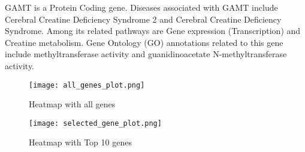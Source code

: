 \documentclass{article}
\begin{document}
GAMT is a Protein Coding gene.
Diseases associated with GAMT include Cerebral Creatine Deficiency Syndrome 2 and Cerebral Creatine Deficiency Syndrome.
Among its related pathways are Gene expression (Transcription) and Creatine metabolism.
Gene Ontology (GO) annotations related to this gene include methyltransferase activity and guanidinoacetate N-methyltransferase activity.


\begin{figure}
	\centering
	\texttt{[image: all\_genes\_plot.png]}
	\caption{Heatmap with all genes}
	\label{fig:heat-all}
\end{figure}


\begin{figure}
	\centering
	\texttt{[image: selected\_gene\_plot.png]}
	\caption{Heatmap with Top 10 genes}
	\label{fig:heat-selected}
\end{figure}
\end{document}
